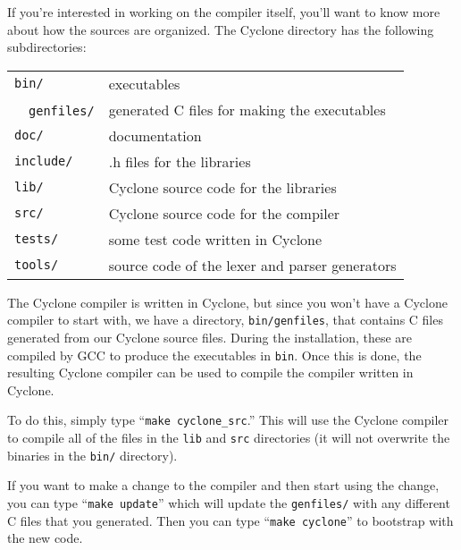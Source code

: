If you're interested in working on the compiler itself, you'll want to
know more about how the sources are organized.  The Cyclone directory
has the following subdirectories:
\begin{center}
\begin{tabular}{ll}
\texttt{bin/}        & executables\\
~~\texttt{genfiles/} & generated C files for making the executables\\
\texttt{doc/}        & documentation\\
\texttt{include/}    & .h files for the libraries\\
\texttt{lib/}        & Cyclone source code for the libraries\\
\texttt{src/}        & Cyclone source code for the compiler\\
\texttt{tests/}      & some test code written in Cyclone\\
\texttt{tools/}      & source code of the lexer and parser generators
\end{tabular}
\end{center}

The Cyclone compiler is written in Cyclone, but since you won't have a
Cyclone compiler to start with, we have a directory,
\texttt{bin/genfiles}, that contains C files generated from our
Cyclone source files.  During the installation, these are compiled by
GCC to produce the executables in \texttt{bin}.  Once this is done,
the resulting Cyclone compiler can be used to compile the compiler
written in Cyclone.

To do this, simply type ``\texttt{make cyclone_src}.''  This will use
the Cyclone compiler to compile all of the files in the \texttt{lib}
and \texttt{src} directories (it will not overwrite the binaries in
the \texttt{bin/} directory).

If you want to make a change to the compiler and then start using the
change, you can type ``\texttt{make update}'' which will update the
\texttt{genfiles/} with any different C files that you generated.
Then you can type ``\texttt{make cyclone}'' to bootstrap with the new
code.

